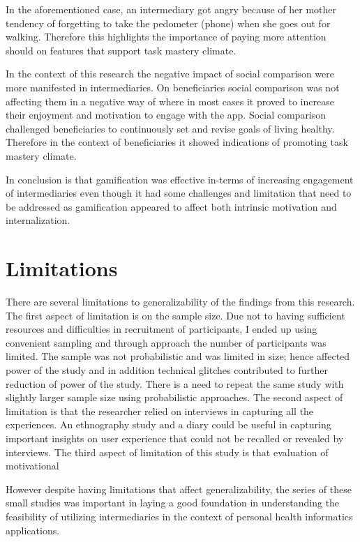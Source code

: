 In the aforementioned case, an intermediary got angry because of her mother tendency of forgetting to take the pedometer (phone) when she goes out for walking. Therefore this highlights the importance of paying more attention should on features that support task mastery climate. 

In the context of this research the negative impact of social comparison were more manifested in intermediaries. On beneficiaries social comparison was not affecting them in a negative way of where in most cases it proved to increase their enjoyment and motivation to engage with the app. Social comparison challenged beneficiaries to continuously set and revise goals of living healthy. Therefore in the context of beneficiaries it showed indications of promoting task mastery climate.  

In conclusion is that gamification was effective in-terms of increasing engagement of intermediaries even though it had some challenges and limitation that need to be addressed as gamification appeared to affect both intrinsic motivation and internalization.

\section{Limitations}
There are several limitations to generalizability of the findings from this research. The first aspect of limitation is on the sample size. Due not to having sufficient resources and difficulties in recruitment of participants, I ended up using convenient sampling and through approach the number of participants was limited. The sample was not probabilistic and was limited in size; hence affected power of the study and in addition technical glitches contributed to further reduction of power of the study. There is a need to repeat the same study with slightly larger sample size using probabilistic approaches.   The second aspect of limitation is that the researcher relied on interviews in capturing all the experiences. An ethnography study and a diary could be useful in capturing important insights on user experience that could not be recalled or revealed by interviews. The third aspect of limitation of this study is that evaluation of motivational  


However despite having limitations that affect generalizability, the series of these small studies was important in laying a good foundation in understanding the feasibility of utilizing intermediaries in the context of personal health informatics applications. 


